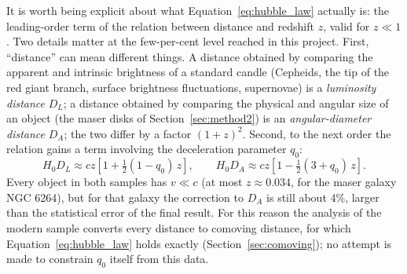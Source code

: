 \documentclass[11pt]{article}
\begin{document}
It is worth being explicit about what Equation~\ref{eq:hubble_law} actually is: the leading-order term of the relation between distance and redshift $z$, valid for $z \ll 1$. Two details matter at the few-per-cent level reached in this project. First, ``distance'' can mean different things. A distance obtained by comparing the apparent and intrinsic brightness of a standard candle (Cepheids, the tip of the red giant branch, surface brightness fluctuations, supernovae) is a \emph{luminosity distance} $D_L$; a distance obtained by comparing the physical and angular size of an object (the maser disks of Section~\ref{sec:method2}) is an \emph{angular-diameter distance} $D_A$; the two differ by a factor $(1+z)^2$. Second, to the next order the relation gains a term involving the deceleration parameter $q_0$:
\begin{equation}
H_0 D_L \approx cz\left[1 + \tfrac{1}{2}(1-q_0)\,z\right], \qquad
H_0 D_A \approx cz\left[1 - \tfrac{1}{2}(3+q_0)\,z\right].
\label{eq:second_order}
\end{equation}
Every object in both samples has $v \ll c$ (at most $z \approx 0.034$, for the maser galaxy NGC 6264), but for that galaxy the correction to $D_A$ is still about 4\%, larger than the statistical error of the final result. For this reason the analysis of the modern sample converts every distance to comoving distance, for which Equation~\ref{eq:hubble_law} holds exactly (Section~\ref{sec:comoving}); no attempt is made to constrain $q_0$ itself from this data.
\end{document}
